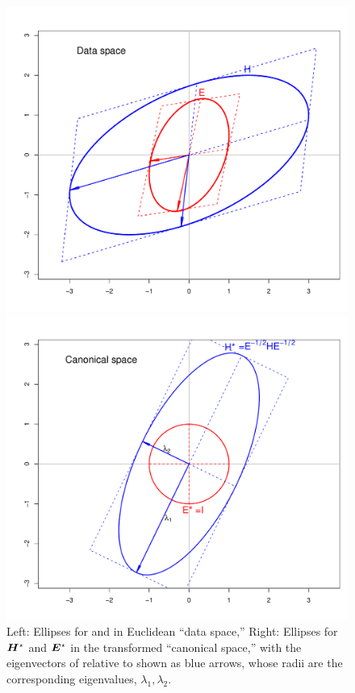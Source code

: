 \begin{figure}[htb]
  \begin{minipage}[c]{.495\textwidth}
   \includegraphics[width=1\linewidth,clip]{fig/ellipse-geneig1}
   \end{minipage}%
  \hfill
  \begin{minipage}[c]{.495\textwidth}
   \includegraphics[width=1\linewidth,clip]{fig/ellipse-geneig2}
  \end{minipage}
  \caption{Left: Ellipses for  and  in Euclidean ``data space,''
   Right: Ellipses for $\bm{H}^\star$ and $\bm{E}^\star$ in the transformed ``canonical space,''
   with the eigenvectors of  relative to  shown as blue arrows, whose radii
   are the corresponding eigenvalues, $\lambda_1, \lambda_2$. }%
  \label{fig:ellipse-geneig}
\end{figure}
